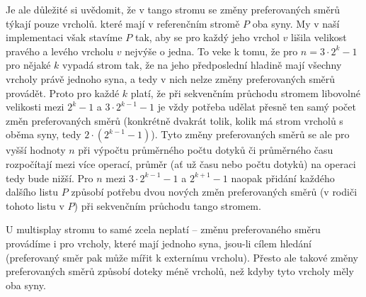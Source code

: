 Je ale důležité si uvědomit, že v tango stromu se změny preferovaných směrů
týkají pouze vrcholů. které mají v referenčním stromě $P$ oba syny. My v naší
implementaci však stavíme $P$ tak, aby se pro každý jeho vrchol $v$ lišila
velikost pravého a levého vrcholu $v$ nejvýše o jedna. To veke k tomu, že pro
$n=3\cdot2^k-1$ pro nějaké $k$ vypadá strom tak, že na jeho předposlední
hladině mají všechny vrcholy právě jednoho syna, a tedy v nich nelze změny
preferovaných směrů provádět. Proto pro každé $k$ platí, že při sekvenčním
průchodu stromem libovolné velikosti mezi $2^k-1$ a $3\cdot 2^{k-1}-1$ je vždy
potřeba udělat přesně ten samý počet změn preferovaných směrů (konkrétně
dvakrát tolik, kolik má strom vrcholů s oběma syny, tedy $2\cdot(2^{k-1} -1)$).
Tyto změny preferovaných směrů se ale pro vyšší hodnoty $n$ při výpočtu
průměrného počtu dotyků či průměrného času rozpočítají mezi více operací,
průměr (ať už času nebo počtu dotyků) na operaci tedy bude nižší. Pro $n$
 mezi $3\cdot 2^{k-1}-1$ a $2^{k+1}-1$ naopak přidání každého dalšího listu $P$ způsobí potřebu dvou nových změn preferovaných směrů (v rodiči tohoto listu v $P$) při sekvenčním průchodu tango stromem.

U multisplay stromu to samé zcela neplatí -- změnu preferovaného směru provádíme i pro vrcholy, které mají jednoho syna, jsou-li cílem hledání (preferovaný směr pak může mířit k externímu vrcholu). Přesto ale takové změny preferovaných směrů způsobí doteky méně vrcholů, než kdyby tyto vrcholy měly oba syny.
